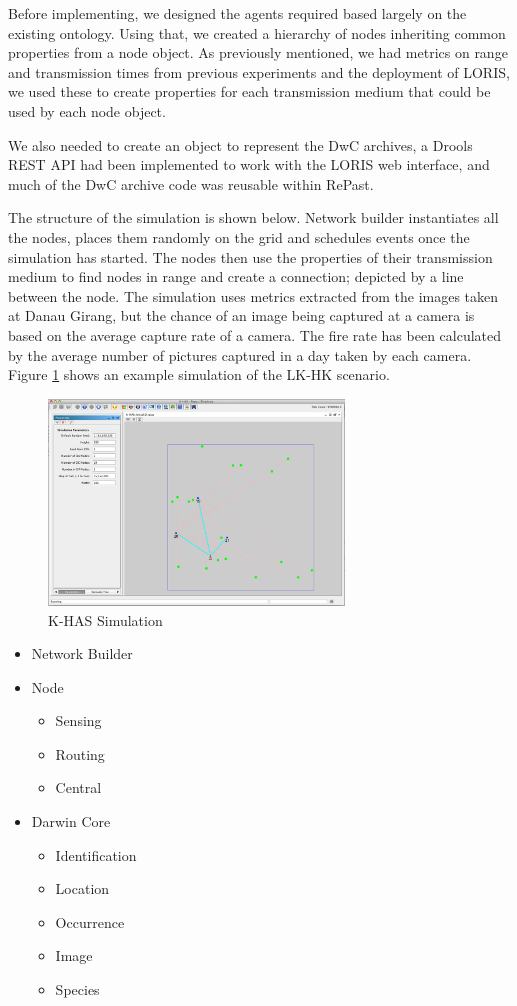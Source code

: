Before implementing, we designed the agents required based largely on the existing ontology. Using that, we created a hierarchy of nodes inheriting common properties from a node object. As previously mentioned, we had metrics on range and transmission times from previous experiments and the deployment of LORIS, we used these to create properties for each transmission medium that could be used by each node object.

We also needed to create an object to represent the DwC archives, a Drools REST API had been implemented to work with the LORIS web interface, and much of the DwC archive code was reusable within RePast. 

The structure of the simulation is shown below. Network builder instantiates all the nodes, places them randomly on the grid and schedules events once the simulation has started. The nodes then use the properties of their transmission medium to find nodes in range and create a connection; depicted by a line between the node. The simulation uses metrics extracted from the images taken at Danau Girang, but the chance of an image being captured at a camera is based on the average capture rate of a camera. The fire rate has been calculated by the average number of pictures captured in a day taken by each camera. Figure \ref{fig:sim} shows an example simulation of the LK-HK scenario.


	\begin{figure}[h]
	\centering
	\includegraphics[width=0.70\textwidth]{Chap7/figures/khas_sim}
	\caption{K-HAS Simulation}
	\label{fig:sim}
	\end{figure}


\begin{itemize}
\item Network Builder
\item Node
	\begin{itemize}
	\item Sensing
	\item Routing
	\item Central
	\end{itemize}
\item Darwin Core
	\begin{itemize}
	\item Identification
	\item Location
	\item Occurrence
	\item Image
	\item Species
	\end{itemize}	 
\end{itemize}

